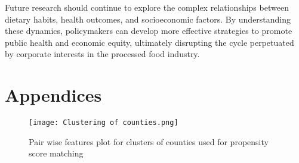 \documentclass[letterpaper, 11pt]{report}
\begin{document}
Future research should continue to explore the complex relationships between dietary habits, health outcomes, and socioeconomic factors. By understanding these dynamics, policymakers can develop more effective strategies to promote public health and economic equity, ultimately disrupting the cycle perpetuated by corporate interests in the processed food industry.


\newpage

\section{Appendices}

\begin{figure}[h!]
    \centering
    \texttt{[image: Clustering of counties.png]}
    \caption{Pair wise features plot for clusters of counties used for propensity score matching}
    \label{fig:clustering}
\end{figure}

\newpage
\printbibliography[heading=bibintoc]
\end{document}
